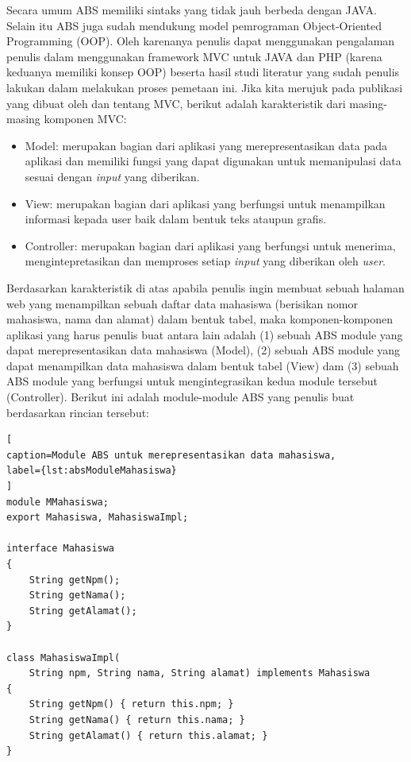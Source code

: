 Secara umum ABS memiliki sintaks yang tidak jauh berbeda dengan JAVA. Selain itu ABS juga sudah mendukung model pemrograman Object-Oriented Programming (OOP). Oleh karenanya penulis dapat menggunakan pengalaman penulis dalam menggunakan framework MVC untuk JAVA dan PHP (karena keduanya memiliki konsep OOP) beserta hasil studi literatur yang sudah penulis lakukan dalam melakukan proses pemetaan ini. Jika kita merujuk pada publikasi yang dibuat oleh \cite{krasner1988desc} dan \cite{leff2001web} tentang MVC, berikut adalah karakteristik dari masing-masing komponen MVC:

\begin{itemize}
    \item Model: merupakan bagian dari aplikasi yang merepresentasikan data pada aplikasi dan memiliki fungsi yang dapat digunakan untuk memanipulasi data sesuai dengan \textit{input} yang diberikan.
    \item View: merupakan bagian dari aplikasi yang berfungsi untuk menampilkan informasi kepada user baik dalam bentuk teks ataupun grafis.
    \item Controller: merupakan bagian dari aplikasi yang berfungsi untuk menerima, mengintepretasikan dan memproses setiap \textit{input} yang diberikan oleh \textit{user}.
\end{itemize}

Berdasarkan karakteristik di atas apabila penulis ingin membuat sebuah halaman web yang menampilkan sebuah daftar data mahasiswa (berisikan nomor mahasiswa, nama dan alamat) dalam bentuk tabel, maka komponen-komponen aplikasi yang harus penulis buat antara lain adalah (1) sebuah ABS module yang dapat merepresentasikan data mahasiswa (Model), (2) sebuah ABS module yang dapat menampilkan data mahasiswa dalam bentuk tabel (View) dam (3) sebuah ABS module yang berfungsi untuk mengintegrasikan kedua module tersebut (Controller). Berikut ini adalah module-module ABS yang penulis buat berdasarkan rincian tersebut:

\begin{lstlisting}[
caption=Module ABS untuk merepresentasikan data mahasiswa,
label={lst:absModuleMahasiswa}
]
module MMahasiswa;
export Mahasiswa, MahasiswaImpl;

interface Mahasiswa
{
	String getNpm();
	String getNama();
	String getAlamat();
}

class MahasiswaImpl(
	String npm, String nama, String alamat) implements Mahasiswa
{
	String getNpm() { return this.npm; }
	String getNama() { return this.nama; }
	String getAlamat() { return this.alamat; }
}
\end{lstlisting}

